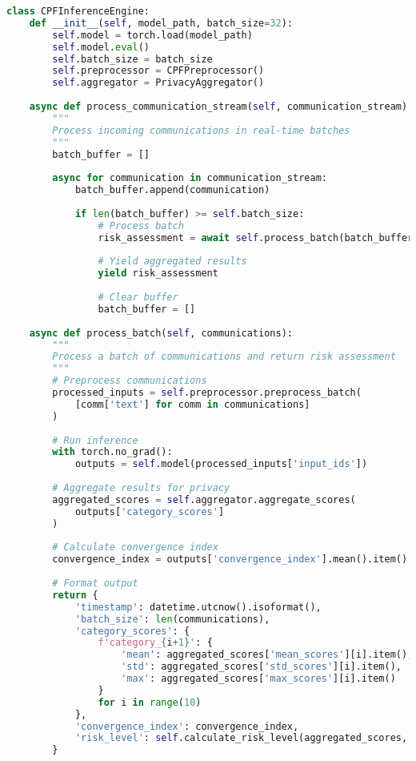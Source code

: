 \documentclass[11pt,a4paper]{article}
\begin{document}
\begin{lstlisting}[language=Python, caption=Real-Time Inference System]
class CPFInferenceEngine:
    def __init__(self, model_path, batch_size=32):
        self.model = torch.load(model_path)
        self.model.eval()
        self.batch_size = batch_size
        self.preprocessor = CPFPreprocessor()
        self.aggregator = PrivacyAggregator()
        
    async def process_communication_stream(self, communication_stream):
        """
        Process incoming communications in real-time batches
        """
        batch_buffer = []
        
        async for communication in communication_stream:
            batch_buffer.append(communication)
            
            if len(batch_buffer) >= self.batch_size:
                # Process batch
                risk_assessment = await self.process_batch(batch_buffer)
                
                # Yield aggregated results
                yield risk_assessment
                
                # Clear buffer
                batch_buffer = []
    
    async def process_batch(self, communications):
        """
        Process a batch of communications and return risk assessment
        """
        # Preprocess communications
        processed_inputs = self.preprocessor.preprocess_batch(
            [comm['text'] for comm in communications]
        )
        
        # Run inference
        with torch.no_grad():
            outputs = self.model(processed_inputs['input_ids'])
        
        # Aggregate results for privacy
        aggregated_scores = self.aggregator.aggregate_scores(
            outputs['category_scores']
        )
        
        # Calculate convergence index
        convergence_index = outputs['convergence_index'].mean().item()
        
        # Format output
        return {
            'timestamp': datetime.utcnow().isoformat(),
            'batch_size': len(communications),
            'category_scores': {
                f'category_{i+1}': {
                    'mean': aggregated_scores['mean_scores'][i].item(),
                    'std': aggregated_scores['std_scores'][i].item(),
                    'max': aggregated_scores['max_scores'][i].item()
                }
                for i in range(10)
            },
            'convergence_index': convergence_index,
            'risk_level': self.calculate_risk_level(aggregated_scores, convergence_index)
        }
    

\end{lstlisting}
\end{document}
